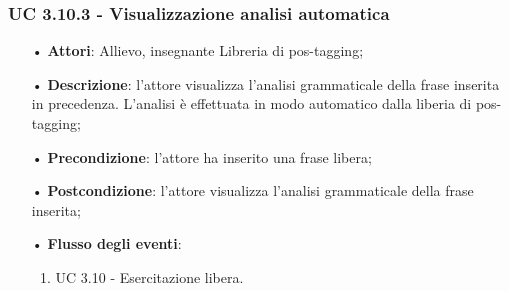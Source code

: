 \subsubsection{UC 3.10.3 - Visualizzazione analisi automatica}
\begin{itemize}
	\item[•]\textbf{Attori}: Allievo, insegnante Libreria di pos-tagging;
	\item[•]\textbf{Descrizione}: l'attore visualizza l'analisi grammaticale della frase inserita in precedenza. L'analisi è effettuata in modo automatico dalla liberia di pos-tagging;
	\item[•]\textbf{Precondizione}: l'attore ha inserito una frase libera;
	\item[•]\textbf{Postcondizione}: l'attore visualizza l'analisi grammaticale della frase inserita;
	\item[•]\textbf{Flusso degli eventi}:
	\begin{enumerate}
		\item UC 3.10 - Esercitazione libera.
	\end{enumerate}
\end{itemize}

